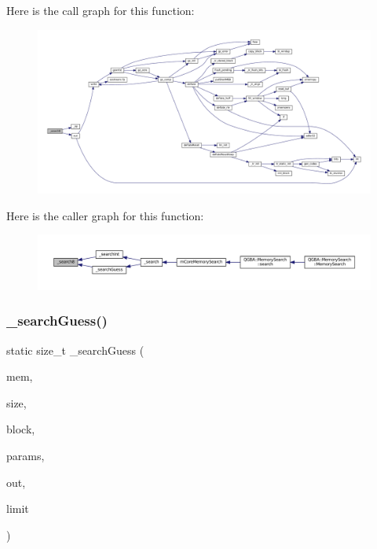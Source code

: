 Here is the call graph for this function\+:
\nopagebreak
\begin{figure}[H]
\begin{center}
\leavevmode
\includegraphics[width=350pt]{mem-search_8c_a109715625d99b7db170075ecdc68363e_cgraph}
\end{center}
\end{figure}
Here is the caller graph for this function\+:
\nopagebreak
\begin{figure}[H]
\begin{center}
\leavevmode
\includegraphics[width=350pt]{mem-search_8c_a109715625d99b7db170075ecdc68363e_icgraph}
\end{center}
\end{figure}
\mbox{\label{mem-search_8c_ac36aa4ea5ca988f0991caaf901aaf916}} 
\subsubsection{\texorpdfstring{\+\_\+search\+Guess()}{\_searchGuess()}}
{\footnotesize\ttfamily static size\+\_\+t \+\_\+search\+Guess (\begin{DoxyParamCaption}\item[{const void $\ast$}]{mem,  }\item[{size\+\_\+t}]{size,  }\item[{const struct m\+Core\+Memory\+Block $\ast$}]{block,  }\item[{const struct m\+Core\+Memory\+Search\+Params $\ast$}]{params,  }\item[{struct m\+Core\+Memory\+Search\+Results $\ast$}]{out,  }\item[{size\+\_\+t}]{limit }\end{DoxyParamCaption})\hspace{0.3cm}{\ttfamily [static]}}

